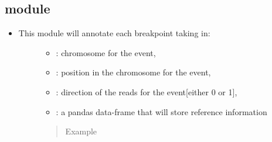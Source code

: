 \documentclass[letterpaper,10pt,english]{sphinxmanual}
\begin{document}
\subsection{ module}
\label{\detokenize{iAnnotateSV:annotateeachbreakpoint-module}}\begin{itemize}
\item {} \begin{description}
\item[{This module will annotate each breakpoint taking in:}] \leavevmode\begin{itemize}
\item {} 
 : chromosome for the event,

\item {} 
 : position in the chromosome for the event,

\item {} 
 : direction of the reads for the event{[}either 0 or 1{]},

\item {} 
 : a pandas data-frame that will store reference information

\end{itemize}
\begin{quote}\begin{description}
\item[{Example}] \leavevmode
{}

\end{description}\end{quote}

\end{description}

\end{itemize}
\end{document}
